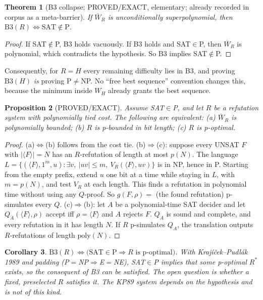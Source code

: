 \documentclass[11pt]{article}
\newtheorem{theorem}{Theorem}
\newtheorem{proposition}[theorem]{Proposition}
\newtheorem{corollary}[theorem]{Corollary}
\theoremstyle{definition}
\theoremstyle{remark}
\newcommand{\Wbar}{\overline{W}}
\begin{document}
\begin{theorem}[B3 collapse; PROVED/EXACT, elementary; already recorded in corpus as a meta-barrier]\label{t:collapse}
If $\Wbar_R$ is unconditionally superpolynomial, then $\mathrm{B3}(R)\iff\mathrm{SAT}\notin\mathrm{P}$.
\end{theorem}
\begin{proof}
If SAT$\notin$P, B3 holds vacuously. If B3 holds and SAT$\in$P, then $\Wbar_R$ is polynomial, which contradicts the hypothesis. So B3 implies SAT$\notin$P.
\end{proof}
\noindent Consequently, for $R=H$ every remaining difficulty lies in B3, and proving $\mathrm{B3}(H)$ \emph{is} proving P$\ne$NP. No ``free best sequence'' convention changes this, because the minimum inside $W_H$ already grants the best sequence.

\begin{proposition}[PROVED/EXACT]\label{p:opt}
Assume SAT$\in$P, and let $R$ be a refutation system with polynomially tied cost. The following are equivalent: (a) $\Wbar_R$ is polynomially bounded; (b) $R$ is p-bounded in bit length; (c) $R$ is p-optimal.
\end{proposition}
\begin{proof}
(a)$\Leftrightarrow$(b) follows from the cost tie.
(b)$\Rightarrow$(c): suppose every UNSAT $F$ with $|\langle F\rangle|=N$ has an $R$-refutation of length at most $p(N)$. The language $L=\{(\langle F\rangle,1^m,u):\exists v,\ |uv|\le m,\ V_R(\langle F\rangle,uv)\}$ is in NP, hence in P. Starting from the empty prefix, extend $u$ one bit at a time while staying in $L$, with $m=p(N)$, and test $V_R$ at each length. This finds a refutation in polynomial time without using any $Q$-proof. So $g(F,\rho)=$ (the found refutation) p-simulates every $Q$.
(c)$\Rightarrow$(b): let $A$ be a polynomial-time SAT decider and let $Q_A(\langle F\rangle,\rho)$ accept iff $\rho=\langle F\rangle$ and $A$ rejects $F$. $Q_A$ is sound and complete, and every refutation in it has length $N$. If $R$ p-simulates $Q_A$, the translation outputs $R$-refutations of length $\mathrm{poly}(N)$.
\end{proof}

\begin{corollary}
$\mathrm{B3}(R)\iff\bigl(\mathrm{SAT}\in\mathrm{P}\Rightarrow R\text{ is p-optimal}\bigr)$. With Krajíček--Pudlák 1989 and padding (P$=$NP$\Rightarrow$E$=$NE), SAT$\in$P implies that some p-optimal $R^\ast$ exists, so the consequent of B3 can be satisfied. The open question is whether a \emph{fixed, preselected} $R$ satisfies it. The KP89 system depends on the hypothesis and is not of this kind.
\end{corollary}
\end{document}
